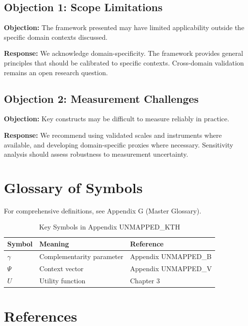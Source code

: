 \subsection{Objection 1: Scope Limitations}

\textbf{Objection:} The framework presented may have limited applicability
outside the specific domain contexts discussed.

\textbf{Response:} We acknowledge domain-specificity. The framework provides
general principles that should be calibrated to specific contexts. Cross-domain
validation remains an open research question.

\subsection{Objection 2: Measurement Challenges}

\textbf{Objection:} Key constructs may be difficult to measure reliably in
practice.

\textbf{Response:} We recommend using validated scales and instruments where
available, and developing domain-specific proxies where necessary. Sensitivity
analysis should assess robustness to measurement uncertainty.



\section{Glossary of Symbols}
\label{sec:kth-glossary}

For comprehensive definitions, see Appendix G (Master Glossary).

\begin{table}[htbp]
\centering
\caption{Key Symbols in Appendix UNMAPPED_KTH}
\begin{tabular}{lll}
\toprule
\textbf{Symbol} & \textbf{Meaning} & \textbf{Reference} \\
\midrule
$\gamma$ & Complementarity parameter & Appendix UNMAPPED_B \\
$\Psi$ & Context vector & Appendix UNMAPPED_V \\
$U$ & Utility function & Chapter 3 \\
\bottomrule
\end{tabular}
\end{table}


\section{References}
\label{sec:kth-references}

